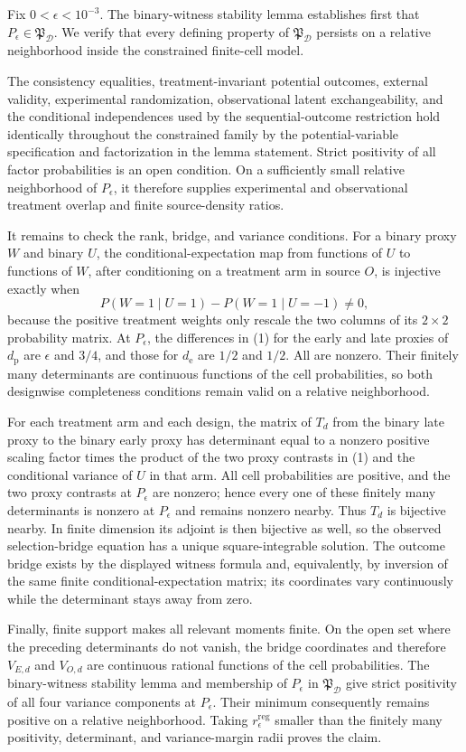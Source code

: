 Fix \(0<\epsilon<10^{-3}\).  The binary-witness stability lemma establishes first that \(P_\epsilon\in\mathfrak P_{\mathcal D}\).  We verify that every defining property of \(\mathfrak P_{\mathcal D}\) persists on a relative neighborhood inside the constrained finite-cell model.

The consistency equalities, treatment-invariant potential outcomes, external validity, experimental randomization, observational latent exchangeability, and the conditional independences used by the sequential-outcome restriction hold identically throughout the constrained family by the potential-variable specification and factorization in the lemma statement.  Strict positivity of all factor probabilities is an open condition.  On a sufficiently small relative neighborhood of \(P_\epsilon\), it therefore supplies experimental and observational treatment overlap and finite source-density ratios.

It remains to check the rank, bridge, and variance conditions.  For a binary proxy \(W\) and binary \(U\), the conditional-expectation map from functions of \(U\) to functions of \(W\), after conditioning on a treatment arm in source \(O\), is injective exactly when
\[
 P(W=1\mid U=1)-P(W=1\mid U=-1)\ne0,                            \tag{1}
\]
because the positive treatment weights only rescale the two columns of its \(2\times2\) probability matrix.  At \(P_\epsilon\), the differences in (1) for the early and late proxies of \(d_{\mathrm p}\) are \(\epsilon\) and \(3/4\), and those for \(d_{\mathrm e}\) are \(1/2\) and \(1/2\).  All are nonzero.  Their finitely many determinants are continuous functions of the cell probabilities, so both designwise completeness conditions remain valid on a relative neighborhood.

For each treatment arm and each design, the matrix of \(T_d\) from the binary late proxy to the binary early proxy has determinant equal to a nonzero positive scaling factor times the product of the two proxy contrasts in (1) and the conditional variance of \(U\) in that arm.  All cell probabilities are positive, and the two proxy contrasts at \(P_\epsilon\) are nonzero; hence every one of these finitely many determinants is nonzero at \(P_\epsilon\) and remains nonzero nearby.  Thus \(T_d\) is bijective nearby.  In finite dimension its adjoint is then bijective as well, so the observed selection-bridge equation has a unique square-integrable solution.  The outcome bridge exists by the displayed witness formula and, equivalently, by inversion of the same finite conditional-expectation matrix; its coordinates vary continuously while the determinant stays away from zero.

Finally, finite support makes all relevant moments finite.  On the open set where the preceding determinants do not vanish, the bridge coordinates and therefore \(V_{E,d}\) and \(V_{O,d}\) are continuous rational functions of the cell probabilities.  The binary-witness stability lemma and membership of \(P_\epsilon\) in \(\mathfrak P_{\mathcal D}\) give strict positivity of all four variance components at \(P_\epsilon\).  Their minimum consequently remains positive on a relative neighborhood.  Taking \(r_\epsilon^{\mathrm{reg}}\) smaller than the finitely many positivity, determinant, and variance-margin radii proves the claim.